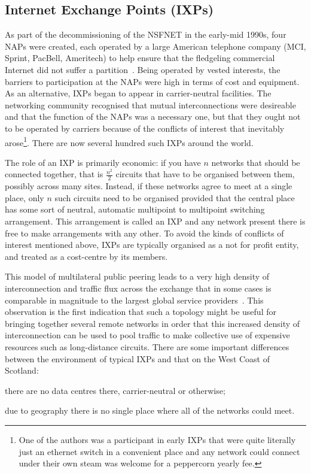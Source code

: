 \subsection{Internet Exchange Points (IXPs)}

As part of the decommissioning of the \ac{NSFNET}
in the early-mid 1990s, four \acp{NAP} were created, each operated by
a large American telephone company (MCI, Sprint, PacBell, Ameritech)
to help ensure that the fledgeling commercial Internet did not suffer
a
partition~\cite{hayes1997computing,Ager:2012:ALE:2342356.2342393}. Being
operated by vested interests, the barriers to participation at
the \acp{NAP} were high in terms of cost and equipment. As an
alternative, \acp{IXP} began to appear in carrier-neutral
facilities. The networking community recognised that mutual
interconnections were desireable and that the function of
the \acp{NAP} was a necessary one, but that they ought not to be
operated by carriers because of the conflicts of interest that
inevitably arose\footnote{One of the authors was a participant in
early \acp{IXP} that were quite literally just an ethernet switch in a
convenient place and any network could connect under their own steam
was welcome for a peppercorn yearly fee.}. There are now several
hundred such \acp{IXP} around the world.

The role of an \ac{IXP} is primarily economic: if
you have $n$ networks that should be connected together, that is
$\frac{n^2}{2}$ circuits that have to be organised between them,
possibly across many sites. Instead, if these networks agree to meet
at a single place, only $n$ such circuits need to be organised
provided that the central place has some sort of neutral, automatic
multipoint to multipoint switching arrangement. This arrangement is
called an \ac{IXP} and any network present there is free to make
arrangements with any other. To avoid the kinds of conflicts of
interest mentioned above, \acp{IXP} are typically organised as a not
for profit entity, and treated as a cost-centre by its members.

This model of multilateral public peering leads to a very high
density of interconnection and traffic flux across the exchange that
in some cases is comparable in magnitude to the largest global
service providers~\cite{Ager:2012:ALE:2342356.2342393}. This
observation is the first indication that such a topology might be
useful for bringing together several remote networks in order that
this increased density of interconnection can be used to pool traffic
to make collective use of expensive resources such as long-distance
circuits. There are some important differences between the environment
of typical \acp{IXP} and that on the West Coast of Scotland:
\begin{inparaenum}[(i)]
  \item there are no data centres there, carrier-neutral or otherwise;
  \item due to geography there is no single place where all of the
    networks could meet.
\end{inparaenum}



